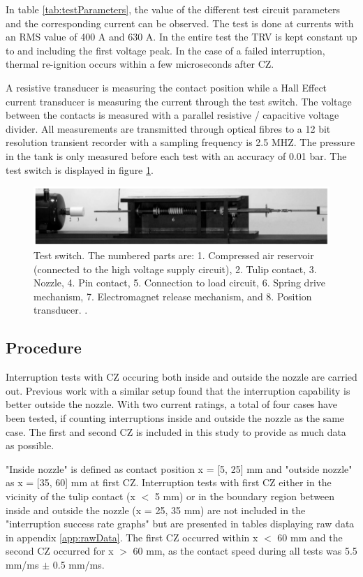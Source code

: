 \documentclass[10pt,a4paper,twoside]{article}
\begin{document}
In table \ref{tab:testParameters}, the value of the different test circuit parameters and the corresponding current can be observed. The test is done at currents with an RMS value of 400 A and 630 A. In the entire test the TRV is kept constant up to and including the first voltage peak. In the case of a failed interruption, thermal re-ignition occurs within a few microseconds after CZ.

A resistive transducer is measuring the contact position while a Hall Effect current transducer is measuring the current through the test switch. The voltage between the contacts is measured with a parallel resistive / capacitive voltage divider. All measurements are transmitted through optical fibres to a 12 bit resolution transient recorder with a sampling frequency is 2.5 MHZ. The pressure in the tank is only measured before each test with an accuracy of 0.01 bar. The test switch is displayed in figure \ref{fig:testSwitchRiggEq}.

\begin{figure} [H]
\centering
\includegraphics[scale=0.5]{Bilder/Method/switchTest.png}
\caption{Test switch. The numbered parts are: 1. Compressed air reservoir (connected to the high voltage supply circuit), 2. Tulip contact, 3. Nozzle, 4. Pin
contact, 5. Connection to load circuit, 6. Spring drive mechanism, 7. Electromagnet release mechanism, and 8. Position transducer. \cite{bib:AFIMVLBA}.} \label{fig:testSwitchRiggEq}
\end{figure}

\newpage
\subsection{Procedure} \label{sec:procedure}
Interruption tests with CZ occuring both inside and outside the nozzle are carried out. Previous work with a similar setup found that the interruption capability is better outside the nozzle. With two current ratings, a total of four cases have been tested, if counting interruptions inside and outside the nozzle as the same case. The first and second CZ is included in this study to provide as much data as possible.

"Inside nozzle" is defined as contact position x = [5, 25] mm and "outside nozzle" as x = [35, 60] mm at first CZ. Interruption tests with first CZ either in the vicinity of the tulip contact (x $<$ 5 mm) or in the boundary region between inside and outside the nozzle (x = 25, 35 mm) are not included in the "interruption success rate graphs" but are presented in tables displaying raw data in appendix \ref{app:rawData}. The first CZ occurred within x $<$ 60 mm and the second CZ occurred for x $>$ 60 mm, as the contact speed during all tests was 5.5 mm/ms $\pm$ 0.5 mm/ms.
\end{document}

